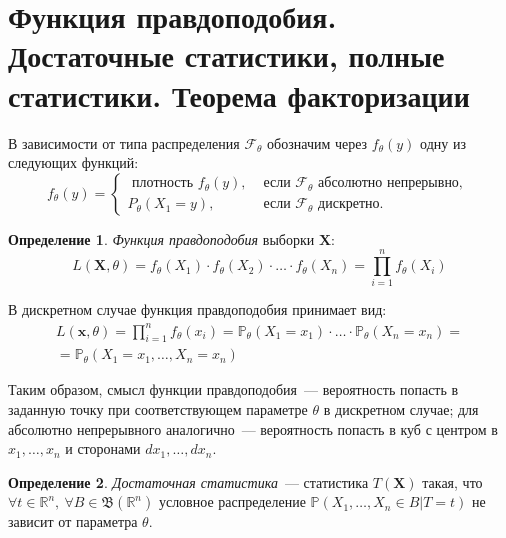\documentclass[oneside,final,14pt]{extreport}
\theoremstyle{plain}
\theoremstyle{definition}
\newtheorem*{defn}{Определение}
\theoremstyle{named}
\begin{document}
\section{Функция правдоподобия. Достаточные статистики, полные статистики. Теорема факторизации}

В зависимости от типа распределения $\mathcal{F}_\theta$ обозначим через $f_{\theta}(y)$ одну из следующих функций:
\begin{equation*}
    f_{\theta}(y) =
    \left\{\begin{array}{ll}
    \text { плотность } f_{\theta}(y), & \text { если } \mathcal{F}_{\theta} \text { абсолютно непрерывно, } \\
    P_{\theta}\left(X_{1}=y\right), & \text { если } \mathcal{F}_{\theta} \text { дискретно. }
    \end{array}\right.
\end{equation*}

\begin{defn}
{\it Функция правдоподобия} выборки $\mathbf{X}$:
\begin{equation*}
    L(\mathbf{X} , \theta)=f_{\theta}\left(X_{1}\right) \cdot f_{\theta}\left(X_{2}\right) \cdot \ldots \cdot f_{\theta}\left(X_{n}\right)=\prod_{i=1}^{n} f_{\theta}\left(X_{i}\right)
\end{equation*}
\end{defn}

В дискретном случае функция правдоподобия принимает вид:
\begin{equation*}
\begin{aligned}
    L(\mathbf{x} , \theta)=\prod_{i=1}^{n} f_{\theta}(x_{i}) 
    = \mathbb{P}_{\theta}(X_{1}=x_{1}) \cdot \ldots \cdot \mathbb{P}_{\theta}(X_{n}=x_{n}) = \\
    = \mathbb{P}_{\theta}(X_{1}=x_{1}, \ldots, X_{n}=x_{n})
\end{aligned}
\end{equation*}

Таким образом, смысл функции правдоподобия~--- вероятность попасть в заданную точку при соответствующем параметре $\theta$ в дискретном случае; для абсолютно непрерывного аналогично~--- вероятность попасть в куб с центром в $x_1, \ldots, x_n$ и сторонами $dx_1, \ldots, dx_n$.

\begin{defn}
{\it Достаточная статистика}~--- статистика $T(\mathbf{X})$ такая, что $\forall t \in \mathbb{R}^{n},~ \forall B \in \mathfrak{B}(\mathbb{R}^{n})$ условное распределение $\mathbb{P}(X_1, \ldots, X_n \in B | T=t)$ не зависит от параметра $\theta$.
\end{defn}
\end{document}
